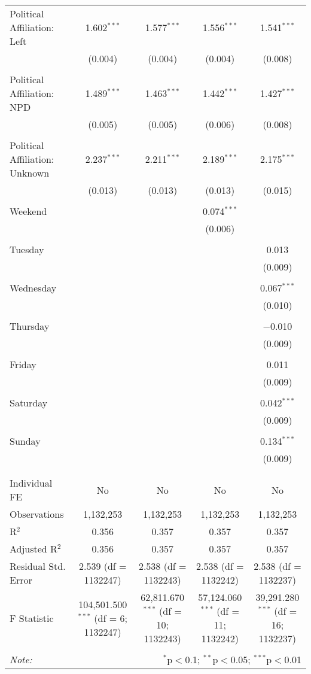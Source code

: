 \documentclass[
]{article}
\begin{document}
\begin{table}[!htbp]
{\begin{tabular}{@{\extracolsep{5pt}}lcccc}
 Political Affiliation: Left & 1.602$^{***}$ & 1.577$^{***}$ & 1.556$^{***}$ & 1.541$^{***}$ \\ 
  & (0.004) & (0.004) & (0.004) & (0.008) \\ 
  & & & & \\ 
 Political Affiliation: NPD & 1.489$^{***}$ & 1.463$^{***}$ & 1.442$^{***}$ & 1.427$^{***}$ \\ 
  & (0.005) & (0.005) & (0.006) & (0.008) \\ 
  & & & & \\ 
 Political Affiliation: Unknown & 2.237$^{***}$ & 2.211$^{***}$ & 2.189$^{***}$ & 2.175$^{***}$ \\ 
  & (0.013) & (0.013) & (0.013) & (0.015) \\ 
  & & & & \\ 
 Weekend &  &  & 0.074$^{***}$ &  \\ 
  &  &  & (0.006) &  \\ 
  & & & & \\ 
 Tuesday &  &  &  & 0.013 \\ 
  &  &  &  & (0.009) \\ 
  & & & & \\ 
 Wednesday &  &  &  & 0.067$^{***}$ \\ 
  &  &  &  & (0.010) \\ 
  & & & & \\ 
 Thursday &  &  &  & $-$0.010 \\ 
  &  &  &  & (0.009) \\ 
  & & & & \\ 
 Friday &  &  &  & 0.011 \\ 
  &  &  &  & (0.009) \\ 
  & & & & \\ 
 Saturday &  &  &  & 0.042$^{***}$ \\ 
  &  &  &  & (0.009) \\ 
  & & & & \\ 
 Sunday &  &  &  & 0.134$^{***}$ \\ 
  &  &  &  & (0.009) \\ 
  & & & & \\ 
\hline \\[-1.8ex] 
Individual FE & No & No & No & No \\ 
Observations & 1,132,253 & 1,132,253 & 1,132,253 & 1,132,253 \\ 
R$^{2}$ & 0.356 & 0.357 & 0.357 & 0.357 \\ 
Adjusted R$^{2}$ & 0.356 & 0.357 & 0.357 & 0.357 \\ 
Residual Std. Error & 2.539 (df = 1132247) & 2.538 (df = 1132243) & 2.538 (df = 1132242) & 2.538 (df = 1132237) \\ 
F Statistic & 104,501.500$^{***}$ (df = 6; 1132247) & 62,811.670$^{***}$ (df = 10; 1132243) & 57,124.060$^{***}$ (df = 11; 1132242) & 39,291.280$^{***}$ (df = 16; 1132237) \\ 
\hline 
\hline \\[-1.8ex] 
\textit{Note:}  & \multicolumn{4}{r}{$^{*}$p$<$0.1; $^{**}$p$<$0.05; $^{***}$p$<$0.01} \\ 
\end{tabular}
} 
\end{table} 
\newpage
\end{document}
